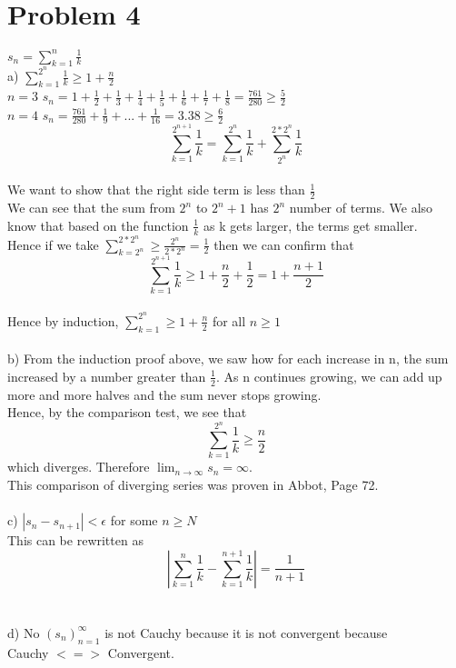 \documentclass{article}
\begin{document}
\section*{Problem 4}
$s_n = \sum_{k=1}^{n} \frac{1}{k}$
\\a) $\sum_{k=1}^{2^n} \frac{1}{k} \geq 1 + \frac{n}{2}$
\\$n = 3$ $s_n = 1 + \frac{1}{2} + \frac{1}{3} + \frac{1}{4} + \frac{1}{5} + \frac{1}{6} + \frac{1}{7} + \frac{1}{8} = \frac{761}{280} \geq \frac{5}{2}$
\\$n = 4$ $s_n = \frac{761}{280} + \frac{1}{9} + ... + \frac{1}{16} = 3.38 \geq \frac{6}{2}$
$$\sum_{k=1}^{2^{n+1}} \frac{1}{k} = \sum_{k=1}^{2^{n}} \frac{1}{k} + \sum_{2^n}^{2*2^{n}} \frac{1}{k}$$
\\We want to show that the right side term is less than $\frac{1}{2}$
\\We can see that the sum from $2^n$ to $2^n+1$ has $2^n$ number of terms. We also know that based on the function $\frac{1}{k}$ as k gets larger, the terms get smaller.
\\Hence if we take $\sum_{k=2^n}^{2*2^n} \geq \frac{2^n}{2*2^n} = \frac{1}{2}$ then we can confirm that $$\sum_{k=1}^{2^{n+1}} \frac{1}{k} \geq 1 + \frac{n}{2} + \frac{1}{2} = 1 + \frac{n+1}{2}$$
\\Hence by induction, $\sum_{k=1}^{2^n} \geq 1 + \frac{n}{2}$ for all $n \geq 1$
\\
\\b) From the induction proof above, we saw how for each increase in n, the sum increased by a number greater than $\frac{1}{2}$. As n continues growing, we can add up more and more halves and the sum never stops growing. 
\\Hence, by the comparison test, we see that $$\sum_{k=1}^{2^n} \frac{1}{k} \geq  \frac{n}{2} $$
which diverges. Therefore $\lim_{n \to \infty} s_n = \infty$.
\\This comparison of diverging series was proven in Abbot, Page 72.
\\
\\c) $|s_n - s_{n+1}| < \epsilon$ for some $n \geq N$
\\This can be rewritten as $$|\sum_{k=1}^{n} \frac{1}{k} - \sum_{k=1}^{n+1} \frac{1}{k}|= \frac{1}{n+1}$$
\\
\\d) No $(s_n)_{n=1}^{\infty}$ is not Cauchy because it is not convergent because 
\\Cauchy $<=>$ Convergent.
\end{document}

